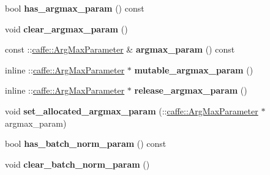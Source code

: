\begin{DoxyCompactItemize}
\item 
\mbox{\label{classcaffe_1_1_layer_parameter_a5f338d11bb89ad086b5821dcb03762d9}} 
bool {\bfseries has\+\_\+argmax\+\_\+param} () const
\item 
\mbox{\label{classcaffe_1_1_layer_parameter_a158557df0fec0c2069e1e58a343ab98e}} 
void {\bfseries clear\+\_\+argmax\+\_\+param} ()
\item 
\mbox{\label{classcaffe_1_1_layer_parameter_a2df7ccacb61e70529b0e08ac10afd3d7}} 
const \+::\mbox{\hyperlink{classcaffe_1_1_arg_max_parameter}{caffe\+::\+Arg\+Max\+Parameter}} \& {\bfseries argmax\+\_\+param} () const
\item 
\mbox{\label{classcaffe_1_1_layer_parameter_a850a5bc0260f15130138fb190ef2b446}} 
inline \+::\mbox{\hyperlink{classcaffe_1_1_arg_max_parameter}{caffe\+::\+Arg\+Max\+Parameter}} $\ast$ {\bfseries mutable\+\_\+argmax\+\_\+param} ()
\item 
\mbox{\label{classcaffe_1_1_layer_parameter_acd04b95d7ce3e8d75ca94c065978a706}} 
inline \+::\mbox{\hyperlink{classcaffe_1_1_arg_max_parameter}{caffe\+::\+Arg\+Max\+Parameter}} $\ast$ {\bfseries release\+\_\+argmax\+\_\+param} ()
\item 
\mbox{\label{classcaffe_1_1_layer_parameter_ad69f8eedbab027ea672feedeb1352129}} 
void {\bfseries set\+\_\+allocated\+\_\+argmax\+\_\+param} (\+::\mbox{\hyperlink{classcaffe_1_1_arg_max_parameter}{caffe\+::\+Arg\+Max\+Parameter}} $\ast$argmax\+\_\+param)
\item 
\mbox{\label{classcaffe_1_1_layer_parameter_ae60efb7b23edbbb522adb659851b960c}} 
bool {\bfseries has\+\_\+batch\+\_\+norm\+\_\+param} () const
\item 
\mbox{\label{classcaffe_1_1_layer_parameter_af1cb2414b7f6a466c049973f36921698}} 
void {\bfseries clear\+\_\+batch\+\_\+norm\+\_\+param} ()
\item 
\mbox{\label{classcaffe_1_1_layer_parameter_a59ba0d197ef43a45cf0f22bcc4bb03a2}} 

\end{DoxyCompactItemize}

